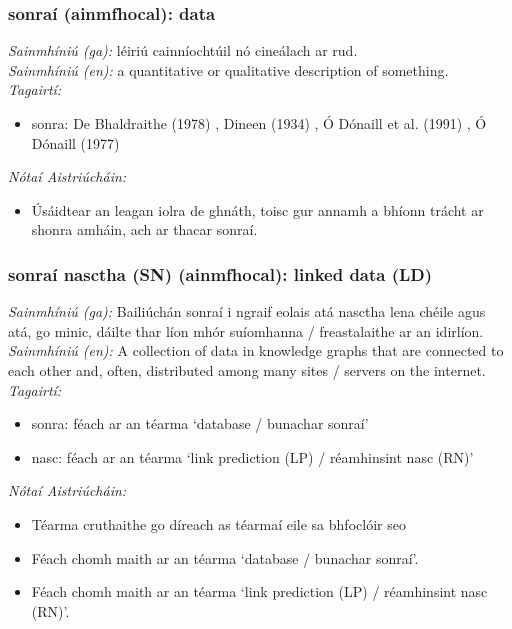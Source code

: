 \documentclass{article}
\begin{document}
\subsubsection*{sonraí (ainmfhocal): data}
 \noindent \textit{Sainmhíniú (ga):} léiriú cainníochtúil nó cineálach ar rud.
\\
 \noindent \textit{Sainmhíniú (en):} a quantitative or qualitative description of something.
\\
 \noindent \textit{Tagairtí:}
\begin{itemize}
	\item sonra: De Bhaldraithe (1978) \cite{de-bhaldraithe}, Dineen (1934) \cite{dineen}, Ó Dónaill et al. (1991) \cite{focloir-beag}, Ó Dónaill (1977) \cite{odonaill}
\end{itemize}

 \noindent \textit{Nótaí Aistriúcháin:}
\begin{itemize}
	\item Úsáidtear an leagan iolra de ghnáth, toisc gur annamh a bhíonn trácht ar shonra amháin, ach ar thacar sonraí.
\end{itemize}


\subsubsection*{sonraí nasctha (SN) (ainmfhocal): linked data (LD)}
 \noindent \textit{Sainmhíniú (ga):} Bailiúchán sonraí i ngraif eolais atá nasctha lena chéile agus atá, go minic, dáilte thar líon mhór suíomhanna / freastalaithe ar an idirlíon.
\\
 \noindent \textit{Sainmhíniú (en):} A collection of data in knowledge graphs that are connected to each other and, often, distributed among many sites / servers on the internet.
\\
 \noindent \textit{Tagairtí:}
\begin{itemize}
	\item sonra: féach ar an téarma `database / bunachar sonraí'
	\item nasc: féach ar an téarma `link prediction (LP) / réamhinsint nasc (RN)'
\end{itemize}

 \noindent \textit{Nótaí Aistriúcháin:}
\begin{itemize}
	\item Téarma cruthaithe go díreach as téarmaí eile sa bhfoclóir seo
	\item Féach chomh maith ar an téarma `database / bunachar sonraí'.
	\item Féach chomh maith ar an téarma `link prediction (LP) / réamhinsint nasc (RN)'.
\end{itemize}
\end{document}
